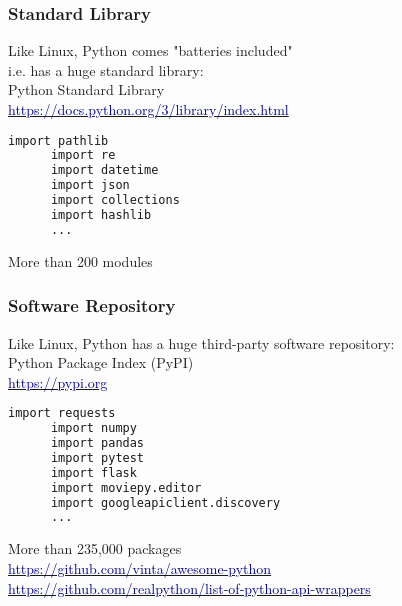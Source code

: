 \begin{frame}[fragile]\frametitle{Standard Library}
   \centering
   Like Linux,
   Python comes "batteries included" \\
   i.e. has a huge standard library: \\ [2ex]
   \Huge Python Standard Library \normalsize \\ [2ex]
   \href{https://docs.python.org/3/library/index.html}
   {\textcolor{DarkBlue}{https://docs.python.org/3/library/index.html}} \\ [2ex]
   \begin{lstlisting}[language=bash, style=bash, autogobble]
      import pathlib
      import re
      import datetime
      import json
      import collections
      import hashlib
      ...
   \end{lstlisting}
   \vspace{1ex}
   \begin{center}
      More than 200 modules
   \end{center}
\end{frame}

\begin{frame}[fragile]\frametitle{Software Repository}
   \centering
   Like Linux,
   Python has a huge third-party software repository: \\ [2ex]
   \Huge Python Package Index (PyPI) \normalsize \\ [1ex]
   \href{https://pypi.org/}{\textcolor{DarkBlue}{https://pypi.org}} \\ [2ex]
   \begin{lstlisting}[language=bash, style=bash, autogobble]
      import requests
      import numpy
      import pandas
      import pytest
      import flask
      import moviepy.editor
      import googleapiclient.discovery
      ...
   \end{lstlisting}
   \vspace{1ex}
   \begin{center}
      More than 235,000 packages \\ [1ex]
      \href{https://github.com/vinta/awesome-python}{\textcolor{DarkBlue}{https://github.com/vinta/awesome-python}} \\
      \href{https://github.com/realpython/list-of-python-api-wrappers}{\textcolor{DarkBlue}{https://github.com/realpython/list-of-python-api-wrappers}}
   \end{center}
\end{frame}

